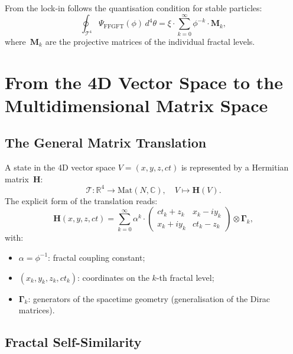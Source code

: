 From the lock-in follows the quantisation condition for stable particles:
\begin{equation}
  \oint_{\mathcal{T}^4}
    \Psi_{\text{FFGFT}}(\phi)\,d^4\theta
  = \xi \cdot \sum_{k=0}^{\infty} \phi^{-k} \cdot \mathbf{M}_k,
\end{equation}
where~$\mathbf{M}_k$ are the projective matrices of the individual
fractal levels.

\section{From the 4D Vector Space to the Multidimensional Matrix Space}

\subsection{The General Matrix Translation}

A state in the 4D vector space $V = (x,y,z,ct)$ is represented by a
Hermitian matrix~$\mathbf{H}$:
\begin{equation}
  \mathcal{T}: \mathbb{R}^4 \to \mathrm{Mat}(N,\mathbb{C}),\quad
  V \mapsto \mathbf{H}(V).
\end{equation}
The explicit form of the translation reads:
\begin{equation}
  \mathbf{H}(x,y,z,ct)
  = \sum_{k=0}^{\infty} \alpha^k \cdot
    \begin{pmatrix}
      ct_k + z_k   & x_k - iy_k \\
      x_k + iy_k   & ct_k - z_k
    \end{pmatrix}
    \otimes \mathbf{\Gamma}_k,
\end{equation}
with:
\begin{itemize}
  \item $\alpha = \phi^{-1}$: fractal coupling constant;
  \item $(x_k, y_k, z_k, ct_k)$: coordinates on the $k$-th fractal level;
  \item $\mathbf{\Gamma}_k$: generators of the spacetime geometry
        (generalisation of the Dirac matrices).
\end{itemize}

\subsection{Fractal Self-Similarity}

